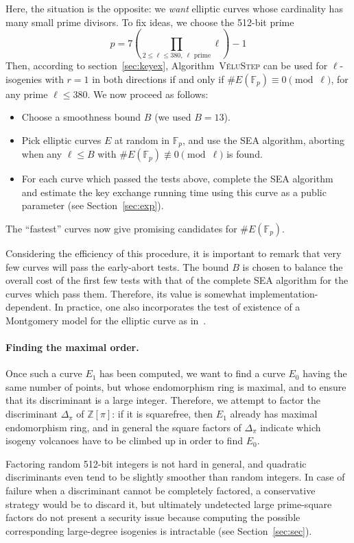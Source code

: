 \documentclass{llncs}
\newcommand{\F}{\mathbb{F}}
\newcommand{\Z}{\mathbb{Z}}
\newcommand{\algstyle}[1]{\textsc{#1}}
\begin{document}
Here, the situation is the opposite: we \emph{want} elliptic curves
whose cardinality has many small prime divisors.
To fix ideas, we choose the 512-bit prime
\[
    p = 7 \left(\prod_{2\leq\ell\leq 380,\ \ell \text{ prime}} \ell\right) - 1
\]
Then, according to section~\ref{sec:keyex}, Algorithm~\algstyle{VéluStep} can be used
for $\ell$-isogenies with $r=1$ in both directions if and only if
$\# E(\F_p) \equiv0\pmod{\ell}$, for any prime $\ell\leq 380$.
We now proceed as follows:
\begin{itemize}
\item Choose a smoothness bound $B$ (we used $B = 13$).
\item Pick elliptic curves $E$ at random in $\F_p$, and use the SEA algorithm,
aborting when any $\ell\leq B$ 
with $\#E(\F_p) \not\equiv 0\pmod{\ell}$ is found.
\item For each curve which passed the tests above, complete the SEA
algorithm and estimate the key exchange running time using this
curve as a public parameter (see Section~\ref{sec:exp}).
\end{itemize}
The ``fastest'' curves now give promising candidates for $\#E(\F_p)$.

Considering the efficiency of this procedure, it is important to remark
that very few curves will pass the early-abort tests. The bound $B$ is
chosen to balance the overall cost of the first few tests with that of
the complete SEA algorithm for the curves which pass them. Therefore,
its value is somewhat implementation-dependent. In practice, one also
incorporates the test of existence of a Montgomery model for the
elliptic curve as in~\cite{OKS00}.

\paragraph{Finding the maximal order.}
Once such a curve $E_1$ has been computed, we want to find a curve
$E_0$ having the same number of points, but whose endomorphism ring is maximal, and
to ensure that its discriminant is a large integer. Therefore, we attempt to
factor the discriminant $Δ_\pi$ of $\Z[\pi]$: if it is squarefree,
then $E_1$ already has maximal endomorphism ring, and in general the square
factors of $Δ_\pi$ indicate which isogeny volcanoes have to be climbed up
in order to find $E_0$.

\begin{remark}
    Factoring random 512-bit integers is not hard in general, and quadratic discriminants
    even tend to be slightly smoother than random integers.
    In case of failure when a discriminant cannot be completely factored,
		a conservative strategy would be to discard it,
    but ultimately undetected large prime-square factors
    do not present a security issue
    because computing the possible corresponding large-degree isogenies 
    is intractable (see Section~\ref{sec:sec}).
\end{remark}
\end{document}
